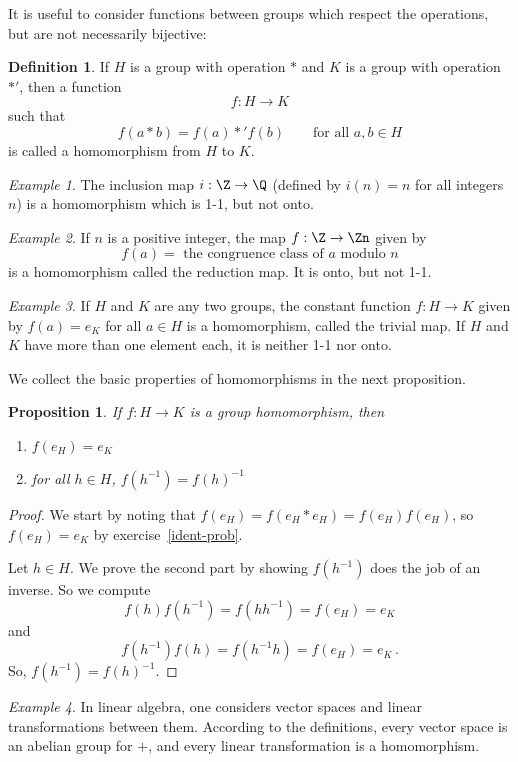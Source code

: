 \documentclass[12pt]{amsart}
\newcommand{\terminology}[1]{\textbf{\textit{#1}}}
\renewcommand{\terminology}[1]{#1}
\newcommand{\term}{\terminology}
\theoremstyle{plain}
\newtheorem{prop}[thm]{Proposition}
\theoremstyle{definition}
\newtheorem{defn}[thm]{Definition}
\theoremstyle{remark}
\newtheorem*{exam}{Example}
\begin{document}
It is useful to consider functions between groups which respect the
operations, but are not necessarily bijective:
\begin{defn}
  If $H$ is a group with operation $*$ and $K$ is a group with
  operation $*'$, then a function
  \[ f:H\to K\]
  such that
  \[ f(a*b)  = f(a)*'f(b)\qquad\text{for all $a,b\in H$}\]
  is called a \term{homomorphism} from $H$ to $K$.
\end{defn}

\begin{exam}
  The inclusion map $i:\Z\to \Q$ (defined by $i(n)=n$ for all integers
  $n$) is a homomorphism which is 1-1, but not onto.
\end{exam}
\begin{exam}
  If $n$ is a positive integer, the map $f:\Z\to \Zn$ given by 
  \[ f(a) = \text{ the congruence class of $a$ modulo $n$} \]
  is a homomorphism called the \term{reduction map}.  It is onto, but
  not 1-1.
\end{exam}
\begin{exam}
  If $H$ and $K$ are any two groups, the constant function $f:H\to K$
  given by $f(a)=e_K$ for all $a\in H$ is a homomorphism, called the
  \term{trivial map}.  If $H$ and $K$ have more than one element each,
  it is neither 1-1 nor onto.
\end{exam}

We collect the basic properties of homomorphisms in the next proposition.
\begin{prop}
If $f:H\to K$ is a group homomorphism, then
\begin{enumerate}
\item $f(e_H) = e_K$
\item for all $h\in H$, $f(h^{-1})=f(h)^{-1}$
\end{enumerate}
\end{prop}
\begin{proof}
  We start by noting that $f(e_H)=f(e_H*e_H) = f(e_H)f(e_H)$, so $f(e_H)=e_K$ by
  exercise~\ref{ident-prob}.
  
  Let $h\in H$.  We prove the second part by showing $f(h^{-1})$ does the job of an
  inverse.  So we compute
  \[ f(h)f(h^{-1}) = f(hh^{-1}) = f(e_H) = e_K\]
  and
  \[ f(h^{-1})f(h) = f(h^{-1}h) = f(e_H) = e_K\,.\]
  So, $f(h^{-1}) = f(h)^{-1}$.
\end{proof}

\begin{exam}
  In linear algebra, one considers vector spaces and linear
  transformations between them.  According to the definitions,
  every vector space is an abelian group for $+$, and every
  linear transformation is a homomorphism.
\end{exam}
\end{document}
